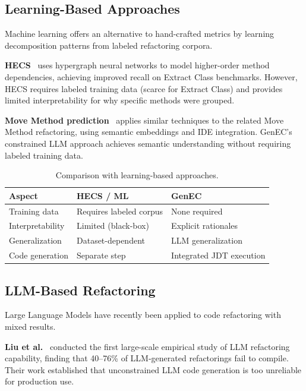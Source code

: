 \documentclass[sigconf]{acmart}
\begin{document}
\subsection{Learning-Based Approaches}
\label{sec:rw-ml}

Machine learning offers an alternative to hand-crafted metrics by learning
decomposition patterns from labeled refactoring corpora.

\textbf{HECS}~\cite{Cui2024HECS} uses hypergraph neural networks to model
higher-order method dependencies, achieving improved recall on Extract Class
benchmarks. However, HECS requires labeled training data (scarce for Extract
Class) and provides limited interpretability for why specific methods were
grouped.

\textbf{Move Method prediction}~\cite{Xu2025MoveMethod} applies similar
techniques to the related Move Method refactoring, using semantic embeddings
and IDE integration. GenEC's constrained LLM approach achieves semantic
understanding without requiring labeled training data.

\begin{table}[t]
\centering\small
\caption{Comparison with learning-based approaches.}
\label{tab:rw-ml}
\begin{tabularx}{\columnwidth}{@{}lXX@{}}
\toprule
\textbf{Aspect} & \textbf{HECS / ML} & \textbf{GenEC} \\
\midrule
Training data     & Requires labeled corpus & None required \\
Interpretability  & Limited (black-box)     & Explicit rationales \\
Generalization    & Dataset-dependent       & LLM generalization \\
Code generation   & Separate step           & Integrated JDT execution \\
\bottomrule
\end{tabularx}
\end{table}

\subsection{LLM-Based Refactoring}
\label{sec:rw-llm}

Large Language Models have recently been applied to code refactoring with mixed
results.

\textbf{Liu et al.}~\cite{Liu2024Empirical} conducted the first large-scale
empirical study of LLM refactoring capability, finding that 40--76\% of
LLM-generated refactorings fail to compile. Their work established that
unconstrained LLM code generation is too unreliable for production use.
\end{document}
